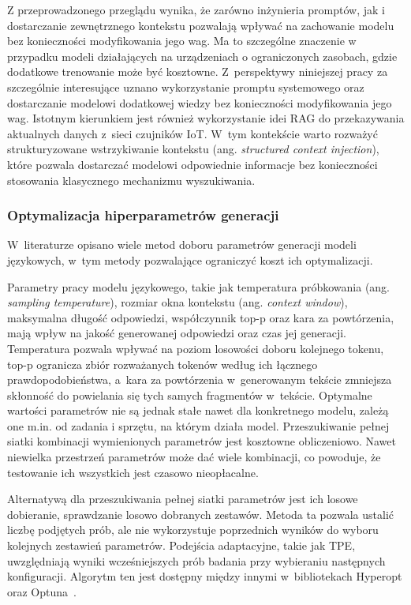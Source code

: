 Z przeprowadzonego przeglądu wynika, że zarówno inżynieria promptów, jak i dostarczanie zewnętrznego kontekstu pozwalają wpływać na zachowanie modelu bez konieczności modyfikowania jego wag. Ma to szczególne znaczenie w przypadku modeli działających na urządzeniach o ograniczonych zasobach, gdzie dodatkowe trenowanie może być kosztowne. Z~perspektywy niniejszej pracy za szczególnie interesujące uznano wykorzystanie promptu systemowego oraz dostarczanie modelowi dodatkowej wiedzy bez konieczności modyfikowania jego wag. Istotnym kierunkiem jest również wykorzystanie idei RAG do przekazywania aktualnych danych z~sieci czujników IoT. W~tym kontekście warto rozważyć strukturyzowane wstrzykiwanie kontekstu (ang. \emph{structured context injection}), które pozwala dostarczać modelowi odpowiednie informacje bez konieczności stosowania klasycznego mechanizmu wyszukiwania.

\subsubsection{Optymalizacja hiperparametrów generacji}

W~literaturze opisano wiele metod doboru parametrów generacji modeli językowych, w~tym metody pozwalające ograniczyć koszt ich optymalizacji.

Parametry pracy modelu językowego, takie jak temperatura próbkowania (ang. \textit{sampling temperature}), rozmiar okna kontekstu (ang. \textit{context window}), maksymalna długość odpowiedzi, współczynnik top-p oraz kara za powtórzenia, mają wpływ na jakość generowanej odpowiedzi oraz czas jej generacji. Temperatura pozwala wpływać na poziom losowości doboru kolejnego tokenu, top-p ogranicza zbiór rozważanych tokenów według ich łącznego prawdopodobieństwa, a~kara za powtórzenia w~generowanym tekście zmniejsza skłonność do powielania się tych samych fragmentów w~tekście. Optymalne wartości parametrów nie są jednak stałe nawet dla konkretnego modelu, zależą one m.in. od zadania i sprzętu, na którym działa model. Przeszukiwanie pełnej siatki kombinacji wymienionych parametrów jest kosztowne obliczeniowo. Nawet niewielka przestrzeń parametrów może dać wiele kombinacji, co powoduje, że testowanie ich wszystkich jest czasowo nieopłacalne.

Alternatywą dla przeszukiwania pełnej siatki parametrów jest ich losowe dobieranie, sprawdzanie losowo dobranych zestawów. Metoda ta pozwala ustalić liczbę podjętych prób, ale nie wykorzystuje poprzednich wyników do wyboru kolejnych zestawień parametrów. Podejścia adaptacyjne, takie jak TPE, uwzględniają wyniki wcześniejszych prób badania przy wybieraniu następnych konfiguracji. Algorytm ten jest dostępny między innymi w~bibliotekach Hyperopt oraz Optuna~\cite{HyperoptDocumentation,Akiba2019}.

